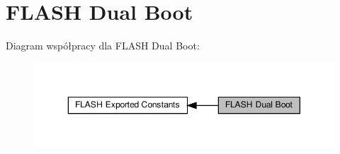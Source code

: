 \hypertarget{group___f_l_a_s_h_ex___dual___boot}{}\section{F\+L\+A\+SH Dual Boot}
\label{group___f_l_a_s_h_ex___dual___boot}
Diagram współpracy dla F\+L\+A\+SH Dual Boot\+:\nopagebreak
\begin{figure}[H]
\begin{center}
\leavevmode
\includegraphics[width=350pt]{group___f_l_a_s_h_ex___dual___boot}
\end{center}
\end{figure}
